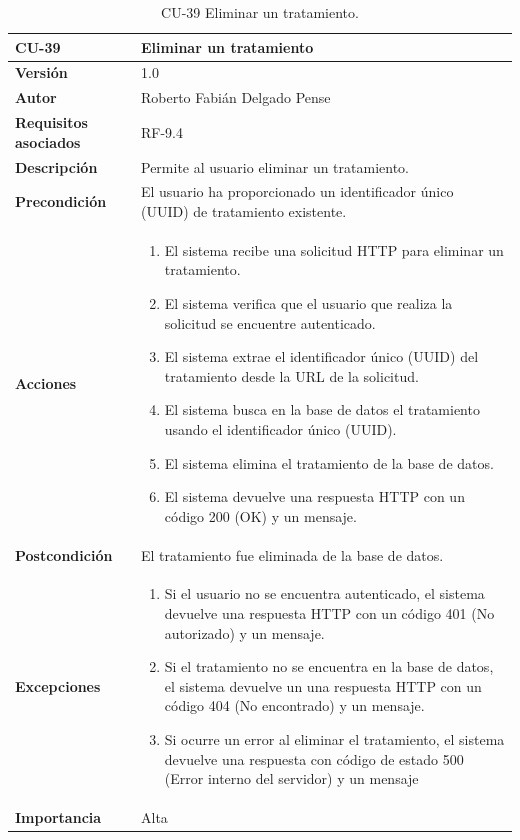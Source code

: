 \begin{table}[p]
	\centering
	\begin{tabularx}{\linewidth}{ p{} p{} }
		\toprule
		\textbf{CU-39}    & \textbf{Eliminar un tratamiento}\\
		\toprule
		\textbf{Versión}              & 1.0    \\
		\textbf{Autor}                & Roberto Fabián Delgado Pense \\
		\textbf{Requisitos asociados} & RF-9.4 \\ 
		\textbf{Descripción}          & Permite al usuario eliminar un tratamiento. \\
		\textbf{Precondición}         & El usuario ha proporcionado un identificador único (UUID) de tratamiento existente.\\
		\textbf{Acciones}             &
		\begin{enumerate}
			\def\labelenumi{\arabic{enumi}.}
			\tightlist
			\item El sistema recibe una solicitud HTTP para eliminar un tratamiento.
                   \item El sistema verifica que el usuario que realiza la solicitud se encuentre autenticado.
			\item El sistema extrae el identificador único (UUID) del tratamiento desde la URL de la solicitud.
                \item El sistema busca en la base de datos el tratamiento usando el identificador único (UUID).
                \item El sistema elimina el tratamiento de la base de datos.
                \item El sistema devuelve una respuesta HTTP con un código 200 (OK) y un mensaje.
            \end{enumerate}\\
		\textbf{Postcondición}        & El tratamiento fue eliminada de la base de datos.\\
		\textbf{Excepciones}          & 
            \begin{enumerate}
			\def\labelenumi{\arabic{enumi}.}
			\tightlist
   			\item Si el usuario no se encuentra autenticado, el sistema devuelve una respuesta HTTP con un código 401 (No autorizado) y un mensaje.
                \item   Si el tratamiento no se encuentra en la base de datos, el sistema devuelve un                           una respuesta HTTP con un código 404 (No encontrado) y un mensaje. 
                \item Si ocurre un error al eliminar el tratamiento, el sistema devuelve una respuesta con código de estado 500 (Error interno del servidor) y un mensaje
            \end{enumerate}\\
		\textbf{Importancia}          & Alta \\
		\bottomrule
	\end{tabularx}
	\caption{CU-39 Eliminar un tratamiento.}
\end{table}

